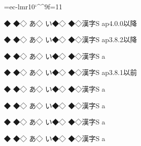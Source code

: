 \font\fn=ec-lmr10\fn\catcode`\^^9f=11
\def\◆{◇}\def\漢{◇}\def\^^9f{S}

{{{\the\ptexlineendmode ◆}
◆\◆
あ\◆}
い◆\漢}
◆\漢 漢字\^^9f a\quad p4.0.0以降

{{{\the\ptexlineendmode ◆}
◆\◆
あ\◆}
い◆\漢}
◆\漢 漢字\^^9f a\quad p3.8.2以降

{{{\the\ptexlineendmode ◆}
◆\◆
あ\◆}
い◆\漢}
◆\漢 漢字\^^9f a

{{{\the\ptexlineendmode ◆}
◆\◆
あ\◆}
い◆\漢}
◆\漢 漢字\^^9f a\quad p3.8.1以前

{{{\the\ptexlineendmode ◆}
◆\◆
あ\◆}
い◆\漢}
◆\漢 漢字\^^9f a

{{{\the\ptexlineendmode ◆}
◆\◆
あ\◆}
い◆\漢}
◆\漢 漢字\^^9f a

{{{\the\ptexlineendmode ◆}
◆\◆
あ\◆}
い◆\漢}
◆\漢 漢字\^^9f a

{{{\the\ptexlineendmode ◆}
◆\◆
あ\◆}
い◆\漢}
◆\漢 漢字\^^9f a

\bye
